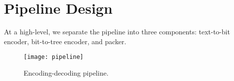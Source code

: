 \section[design]{Pipeline Design}

At a high-level, we separate the pipeline into three components: text-to-bit encoder, bit-to-tree encoder, and packer.

\begin{figure}[h]
    \caption{Encoding-decoding pipeline.}
    \centering
    \texttt{[image: pipeline]}
\end{figure}

